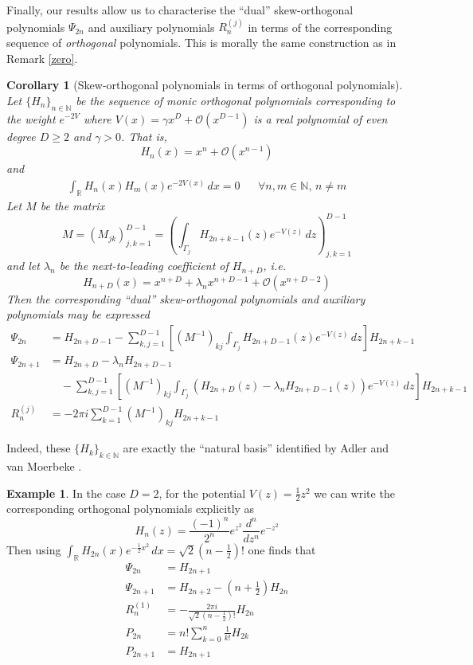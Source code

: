 \documentclass[12pt]{article}
\newtheorem{corollary}[theorem]{Corollary}
\theoremstyle{definition}
\newtheorem{exmp}{Example}[section]
\begin{document}
Finally, our results allow us to characterise the \enquote{dual} skew-orthogonal polynomials $\Psi_{2n}$ and auxiliary polynomials $R^{(j)}_n$ in terms of the corresponding sequence of \textit{orthogonal} polynomials. This is morally the same construction as in Remark \ref{zero}.

\begin{corollary}[Skew-orthogonal polynomials in terms of orthogonal polynomials]\label{orthog} Let $\{ H_n \}_{n \in \mathbb{N}}$ be the sequence of monic orthogonal polynomials corresponding to the weight $e^{-2V}$ where $V(x) = \gamma x^D+ \mathcal{O}(x^{D-1})$ is a real polynomial of even degree $D \geq 2$ and $\gamma > 0$. That is, $$H_n(x) = x^n + \mathcal{O}(x^{n-1})$$ and
\begin{align*}
\int_\mathbb{R}H_n(x) H_m(x) e^{-2V(x)} \, dx = 0 & &\forall n,m \in \mathbb{N},  \, n \neq m
\end{align*}
Let $M$ be the matrix
$$M = \left( M_{jk}\right)_{j,k=1}^{D-1} = \left( \int_{\Gamma_j} H_{2n+k-1}(z) e^{-V(z)}\, dz \right)_{j,k=1}^{D-1}$$
and let $\lambda_n$ be the next-to-leading coefficient of $H_{n+D}$, i.e. $$H_{n+D}(x) = x^{n+D}+\lambda_n x^{n+D-1} + \mathcal{O}(x^{n+D-2})$$ Then the corresponding \enquote{dual} skew-orthogonal polynomials and auxiliary polynomials may be expressed
\begin{align*}
\Psi_{2n} &= H_{2n+D-1} - \sum_{k,j=1}^{D-1} \left[  (M^{-1})_{kj}\int_{\Gamma_j} H_{2n+D-1}(z)e^{-V(z)}\, dz \right] H_{2n+k-1} \\
\Psi_{2n+1} &= H_{2n+D} - \lambda_n H_{2n+D-1} \\
&\quad- \sum_{k,j=1}^{D-1} \left[  (M^{-1})_{kj}\int_{\Gamma_j} (H_{2n+D}(z) - \lambda_n H_{2n+D-1}(z))e^{-V(z)}\, dz \right] H_{2n+k-1} \\
R^{(j)}_n &= - 2\pi i \sum_{k=1}^{D-1} (M^{-1})_{kj} H_{2n+k-1}
\end{align*}
\end{corollary}
Indeed, these $\{ H_k \}_{k \in \mathbb{N}}$ are exactly the \enquote{natural basis} identified by Adler and van Moerbeke \cite{adler1999pfaff}.
\begin{exmp}
In the case $D=2$, for the potential $V(z) = \frac{1}{2}z^2$ we can write the corresponding orthogonal polynomials explicitly as
\begin{equation}\label{Hermite}
H_n(z) = \frac{(-1)^n}{2^n} e^{z^2} \frac{d^n}{dz^n} e^{-z^2}
\end{equation}
Then using $\int_\mathbb{R}H_{2n}(x) e^{-\frac{1}{2}x^2}\, dx =  \sqrt{2} \left( n - \frac{1}{2} \right)! $ one finds that
\begin{align*}
\Psi_{2n} &= H_{2n+1} \\
\Psi_{2n+1} &= H_{2n+2} - \left( n +\frac{1}{2} \right) H_{2n} \\
R^{(1)}_n &= -\frac{2\pi i }{ \sqrt{2} \left( n - \frac{1}{2} \right)!} H_{2n} \\
P_{2n} &= n! \sum_{k=0}^n \frac{1}{k!} H_{2k} \\
P_{2n+1} &= H_{2n+1}
\end{align*}
\end{exmp}
\end{document}

